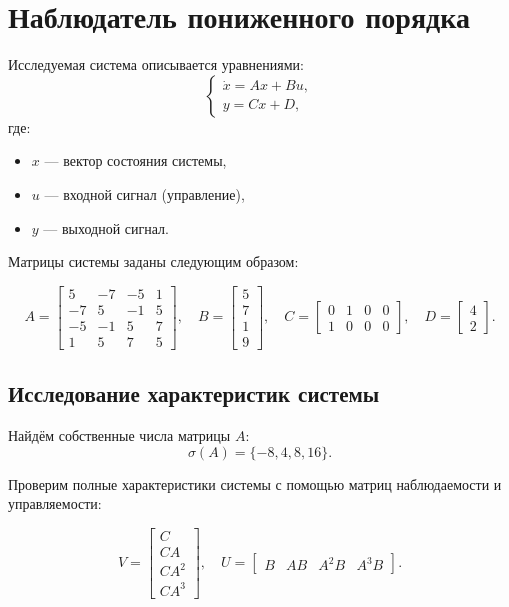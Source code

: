 \section{Наблюдатель пониженного порядка}

Исследуемая система описывается уравнениями:
\[
\begin{cases}
    \dot{x} = Ax + Bu, \\
    y = Cx + D,
\end{cases}
\]
где:
\begin{itemize}
    \item $x$ — вектор состояния системы,
    \item $u$ — входной сигнал (управление),
    \item $y$ — выходной сигнал.
\end{itemize}

Матрицы системы заданы следующим образом:

\[
A = \begin{bmatrix}
    5 & -7 & -5 & 1 \\
    -7 & 5 & -1 & 5 \\
    -5 & -1 & 5 & 7 \\
    1 & 5 & 7 & 5
\end{bmatrix}, \quad
B = \begin{bmatrix}
    5 \\
    7 \\
    1 \\
    9
\end{bmatrix}, \quad
C = \begin{bmatrix}
    0 & 1 & 0 & 0 \\
    1 & 0 & 0 & 0
\end{bmatrix}, \quad
D = \begin{bmatrix}
    4 \\
    2
\end{bmatrix}.
\]


\subsection{Исследование характеристик системы}

Найдём собственные числа матрицы $A$:
\[
    \sigma(A) = \{-8, 4, 8, 16\}.
\]

Проверим полные характеристики системы с помощью матриц наблюдаемости и управляемости:

\[
V = \begin{bmatrix}
    C \\
    CA \\
    CA^2 \\
    CA^3
\end{bmatrix}, \quad
    U = \begin{bmatrix}
    B & AB & A^2B & A^3B
\end{bmatrix}.
\]

